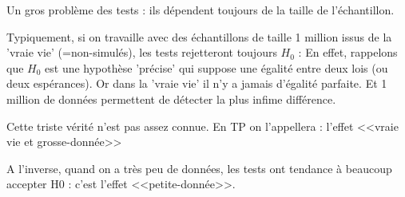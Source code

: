 \documentclass{article}
\begin{document}
Un gros problème des tests : ils dépendent toujours de la taille de l'échantillon.

Typiquement, si on travaille avec des échantillons de taille 1 million issus de la 'vraie vie' (=non-simulés), les tests rejetteront toujours $H_0$ :
En effet, rappelons que $H_0$ est une hypothèse 'précise' qui suppose une égalité entre deux lois (ou deux espérances). 
 Or dans la 'vraie vie' il n'y a jamais d'égalité parfaite. Et  1 million de données permettent de détecter la plus infime différence.

 Cette triste vérité n'est pas assez connue.  En TP on l'appellera :  l'effet <<vraie vie et grosse-donnée>>

 A l'inverse, quand on a très peu de données, les tests ont tendance à beaucoup accepter H0 : c'est l'effet <<petite-donnée>>.
\end{document}
